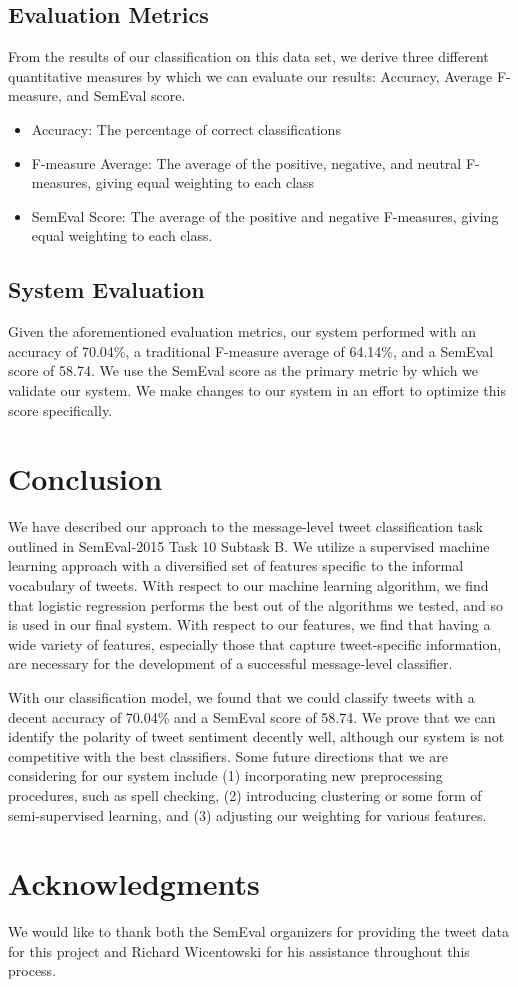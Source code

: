 \documentclass[11pt,letterpaper]{article}
\begin{document}
\subsection{Evaluation Metrics}

From the results of our classification on this data set, we derive three different quantitative measures by which we can evaluate our results: Accuracy, Average F-measure, and SemEval score.

\begin{itemize}
  \item Accuracy: The percentage of correct classifications
  \item F-measure Average: The average of the positive, negative, and neutral F-measures, giving equal weighting to each class
  \item SemEval Score: The average of the positive and negative F-measures, giving equal weighting to each class.
\end{itemize}

\subsection{System Evaluation}

Given the aforementioned evaluation metrics, our system performed with an accuracy of 70.04\%, a traditional F-measure average of 64.14\%, and a SemEval score of 58.74. We use the SemEval score as the primary metric by which we validate our system. We make changes to our system in an effort to optimize this score specifically. 

\section{Conclusion}

We have described our approach to the message-level tweet classification task outlined in SemEval-2015 Task 10 Subtask B. We utilize a supervised machine learning approach with a diversified set of features specific to the informal vocabulary of tweets. With respect to our machine learning algorithm, we find that logistic regression performs the best out of the algorithms we tested, and so is used in our final system. With respect to our features, we find that having a wide variety of features, especially those that capture tweet-specific information, are necessary for the development of a successful message-level classifier.

With our classification model, we found that we could classify tweets with a decent accuracy of 70.04\% and a SemEval score of 58.74. We prove that we can identify the polarity of tweet sentiment decently well, although our system is not competitive with the best classifiers. Some future directions that we are considering for our system include (1) incorporating new preprocessing procedures, such as spell checking, (2) introducing clustering or some form of semi-supervised learning, and (3) adjusting our weighting for various features.

\section*{Acknowledgments}

We would like to thank both the SemEval organizers for providing the tweet data for this project and Richard Wicentowski for his assistance throughout this process.


\end{document}
